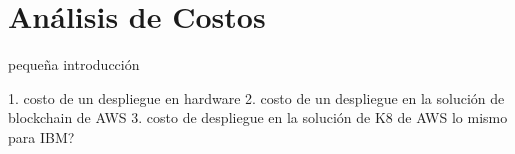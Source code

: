 \chapter{Análisis de Costos} %
\label{Chapter7}
pequeña introducción

1. costo de un despliegue en hardware
2. costo de un despliegue en la solución de blockchain de AWS
3. costo de despliegue en la solución de K8 de AWS
lo mismo para IBM?
